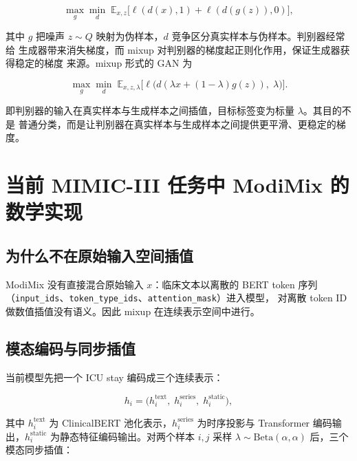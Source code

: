 \documentclass[11pt,a4paper]{article}
\theoremstyle{definition}
\begin{document}
\begin{equation}
  \max_{g}\min_{d}\;\mathbb{E}_{x,z}\bigl[
    \ell(d(x),1)+\ell(d(g(z)),0)
  \bigr],
  \label{eq:gan}
\end{equation}

其中 $g$ 把噪声 $z\sim Q$ 映射为伪样本，$d$ 竞争区分真实样本与伪样本。判别器经常给
生成器带来消失梯度，而 mixup 对判别器的梯度起正则化作用，保证生成器获得稳定的梯度
来源。mixup 形式的 GAN 为

\begin{equation}
  \max_{g}\min_{d}\;\mathbb{E}_{x,z,\lambda}\bigl[
    \ell\bigl(d(\lambda x+(1-\lambda)g(z)),\;\lambda\bigr)
  \bigr].
  \label{eq:mixup-gan}
\end{equation}

即判别器的输入在真实样本与生成样本之间插值，目标标签变为标量 $\lambda$。其目的不是
普通分类，而是让判别器在真实样本与生成样本之间提供更平滑、更稳定的梯度。

\section{当前 MIMIC-III 任务中 ModiMix 的数学实现}
\label{sec:modimix}

\subsection{为什么不在原始输入空间插值}

ModiMix 没有直接混合原始输入 $x$：临床文本以离散的 BERT token 序列
（\texttt{input\_ids}、\texttt{token\_type\_ids}、\texttt{attention\_mask}）进入模型，
对离散 token ID 做数值插值没有语义。因此 mixup 在连续表示空间中进行。

\subsection{模态编码与同步插值}

当前模型先把一个 ICU stay 编码成三个连续表示：

\begin{equation}
  h_i=\bigl(h_i^{\text{text}},\;h_i^{\text{series}},\;h_i^{\text{static}}\bigr),
  \label{eq:modalities}
\end{equation}

其中 $h_i^{\text{text}}$ 为 ClinicalBERT 池化表示，$h_i^{\text{series}}$ 为时序投影与
Transformer 编码输出，$h_i^{\text{static}}$ 为静态特征编码输出。对两个样本 $i,j$ 采样
$\lambda\sim\mathrm{Beta}(\alpha,\alpha)$ 后，三个模态同步插值：
\end{document}
